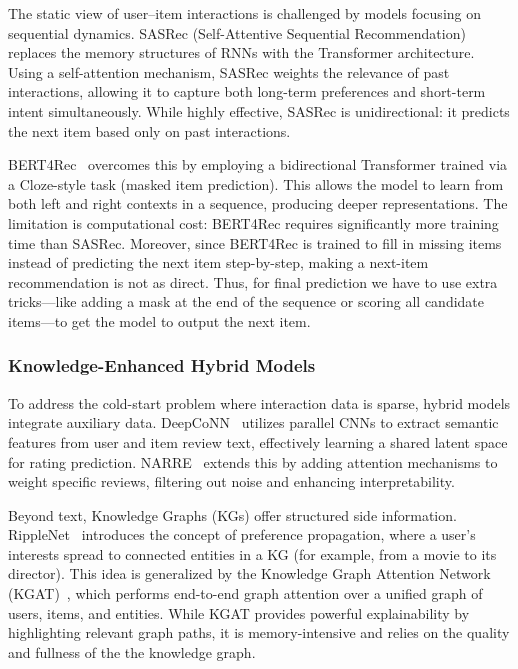 \documentclass[11pt]{article}
\begin{document}
The static view of user--item interactions is challenged by models focusing on sequential dynamics. SASRec (Self-Attentive Sequential Recommendation)~\cite{kang2018sasrec} replaces the  memory structures of RNNs with the Transformer architecture. Using a self-attention mechanism, SASRec weights the relevance of past interactions, allowing it to capture both long-term preferences and short-term intent simultaneously. While highly effective, SASRec is unidirectional: it predicts the next item based only on past interactions.

BERT4Rec~\cite{sun2019bert4rec} overcomes this by employing a bidirectional Transformer trained via a Cloze-style task (masked item prediction). This allows the model to learn from both left and right contexts in a sequence, producing deeper representations. The limitation is computational cost: BERT4Rec requires significantly more training time than SASRec. Moreover, since BERT4Rec is trained to fill in missing items instead of predicting the next item step-by-step, making a next-item recommendation is not as direct. Thus, for final prediction we have to use extra tricks—like adding a mask at the end of the sequence or scoring all candidate items—to get the model to output the next item.

\subsubsection{Knowledge-Enhanced Hybrid Models}

To address the cold-start problem where interaction data is sparse, hybrid models integrate auxiliary data. DeepCoNN~\cite{zheng2017deepconn} utilizes parallel CNNs to extract semantic features from user and item review text, effectively learning a shared latent space for rating prediction. NARRE~\cite{chen2018narre} extends this by adding attention mechanisms to weight specific reviews, filtering out noise and enhancing interpretability.

Beyond text, Knowledge Graphs (KGs) offer structured side information. RippleNet~\cite{wang2018ripplenet} introduces the concept of preference propagation, where a user's interests spread to connected entities in a KG (for example, from a movie to its director). This idea is generalized by the Knowledge Graph Attention Network (KGAT)~\cite{wang2019kgat}, which performs end-to-end graph attention over a unified graph of users, items, and entities. While KGAT provides powerful explainability by highlighting relevant graph paths, it is memory-intensive and relies on the quality and fullness of the the knowledge graph.
\end{document}
